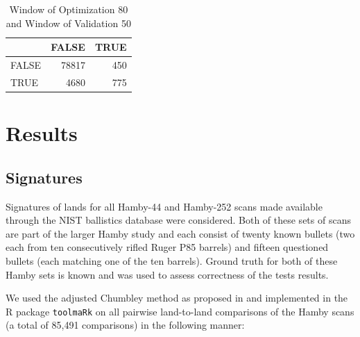 \documentclass[12pt]{article}
\begin{document}
\begin{table}[!h]

\caption{\label{tab:unnamed-chunk-4}Window of Optimization 80 and Window of Validation 50}
\centering
\begin{tabular}[t]{lrr}
\toprule
  & FALSE & TRUE\\
\midrule
FALSE & 78817 & 450\\
TRUE & 4680 & 775\\
\bottomrule
\end{tabular}
\end{table}

\section{Results}\label{results}

\subsection{Signatures}\label{signatures}

Signatures of lands for all Hamby-44 and Hamby-252 scans made available
through the NIST ballistics database \citep{nist} were considered. Both
of these sets of scans are part of the larger Hamby study \citep{hamby}
and each consist of twenty known bullets (two each from ten
consecutively rifled Ruger P85 barrels) and fifteen questioned bullets
(each matching one of the ten barrels). Ground truth for both of these
Hamby sets is known and was used to assess correctness of the tests
results.

We used the adjusted Chumbley method as proposed in \citet{hadler} and
implemented in the R package \texttt{toolmaRk} \citep{toolmark} on all
pairwise land-to-land comparisons of the Hamby scans (a total of 85,491
comparisons) in the following manner:

\begin{table}[!h]

\caption{\label{tab:unnamed-chunk-5}Overview of parameter settings used for optimization and validation windows for bullet land signatures.}
\centering
{}
\end{table}
\end{document}
